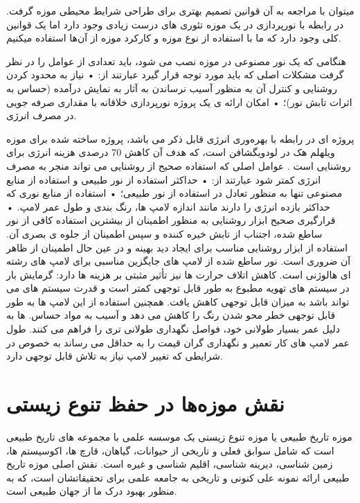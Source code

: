 میتوان با مراجعه به آن قوانین تصمیم بهتری برای طراحی شرایط محیطی موزه گرفت.
در رابطه با نورپردازی در یک موزه تئوری های درست زیادی وجود دارد اما یک قوانین کلی وجود دارد که ما با استفاده از نوع موزه‌ و کارکرد موزه از آن‌ها استفاده میکنیم.


هنگامی که یک نور مصنوعی در موزه نصب می شود، باید تعدادی از عوامل را در نظر گرفت  مشکلات اصلی که باید مورد توجه قرار گیرد عبارتند از:
 • نیاز به محدود کردن روشنایی و کنترل آن به منظور آسیب نرساندن به آثار به نمایش درآمده (حساس به اثرات تابش نور)؛
• امکان ارائه ی یک پروژه نورپردازی خلاقانه با مقداری صرفه جویی در مصرف انرژی.

پروژه ای در رابطه با بهره‌وری انرژی قابل ذکر می باشد، پروژه ساخته شده 
 برای موزه ویلهلم هک در لودویگشافن است، که هدف آن کاهش 70 درصدی هزینه انرژی برای روشنایی‌ است .
عوامل اصلی که استفاده صحیح از روشنایی می تواند منجر به مصرف انرژی کمتر شود عبارتند از:
 • حداکثر استفاده از نور طبیعی و استفاده از منابع مصنوعی تنها به منظور تعادل در استفاده از نور طبیعی؛ 
• استفاده از منابع نوری که حداکثر بازده انرژی را دارند مانند اندازه لامپ ها، رنگ بندی و طول عمر لامپ. 
• قرارگیری صحیح ابزار روشنایی به منظور اطمینان از بیشترین استفاده کافی از نور ساطع شده، اجتناب از تابش خیره کننده و سپس اطمینان از جلوه ی بصری آن.
استفاده از ابزار روشنایی مناسب برای ایجاد دید بهینه و در عین حال اطمینان از ظاهر آن ضروری است. نور ساطع شده از لامپ های  جایگزین مناسبی برای لامپ های رشته ای هالوژنی است. کاهش اتلاف حرارت  ها نیز تأثیر مثبتی بر هزینه ها دارد: گرمایش بار در سیستم های تهویه مطبوع به طور قابل توجهی کمتر است و قدرت سیستم های  می تواند باشد به میزان قابل توجهی کاهش یافت. همچنین استفاده از این لامپ ها به طور قابل توجهی خطر محو شدن رنگ را کاهش می دهد و آسیب به مواد حساس.  ها به دلیل عمر بسیار طولانی خود، فواصل نگهداری طولانی تری را فراهم می کنند. طول عمر لامپ های  کار تعمیر و نگهداری گران قیمت را به حداقل می رساند  به خصوص در شرایطی که تغییر لامپ نیاز به تلاش قابل توجهی دارد.


\section{نقش موزه‌ها در حفظ تنوع زیستی}
موزه تاریخ طبیعی یا موزه تنوع زیستی یک موسسه علمی با مجموعه های تاریخ طبیعی است که شامل سوابق فعلی و تاریخی از حیوانات، گیاهان، قارچ ها، اکوسیستم ها، زمین شناسی، دیرینه شناسی، اقلیم شناسی و غیره است.
نقش اصلی موزه تاریخ طبیعی ارائه نمونه علی کنونی و تاریخی به جامعه علمی برای تحقیقاتشان است، که به منظور بهبود درک ما از جهان طبیعی است.

